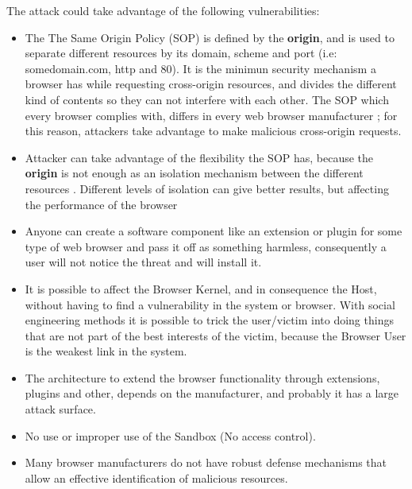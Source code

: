 \documentclass{sig-alternate-05-2015}
\begin{document}
The attack could take advantage of the following vulnerabilities:
\begin{itemize}
  \item The The Same Origin Policy (SOP) is defined by the \textbf{origin}, and is used to separate different resources by its domain, scheme and port (i.e: somedomain.com, http and 80). It is the minimun security mechanism a browser has while requesting cross-origin resources, and divides the different kind of contents so they can not interfere with each other. The SOP which every browser complies with, differs in every web browser manufacturer \cite{W3C-SOP,Reis2009, Jackson2008, Crowley2010, Paola2006}; for this reason, attackers take advantage to make malicious cross-origin requests.
  \item Attacker can take advantage of the flexibility the SOP has, because the \textbf{origin} is not enough as an isolation mechanism between the different resources \cite{Silic2010, Barth2009, Yason, Liu2012}. Different levels of isolation can give better results, but affecting the performance of the browser \cite{barth2008security,GoogleChromeIsolation}
  \item Anyone can create a software component like an extension or plugin for some type of web browser and pass it off as something harmless, consequently a user will not notice the threat and will install it. 
  \item It is possible to affect the Browser Kernel, and in consequence the Host, without having to find a vulnerability in the system or browser. With social engineering methods it is possible to trick the user/victim into doing things that are not part of the best interests of the victim, because the Browser User is the weakest link in the system.
  \item The architecture to extend the browser functionality through extensions, plugins and other, depends on the manufacturer, and probably it has a large attack surface.
  \item No use or improper use of the Sandbox (No access control).
  \item Many browser manufacturers do not have robust defense mechanisms that allow an effective identification of malicious resources.
\end{itemize}
\end{document}
